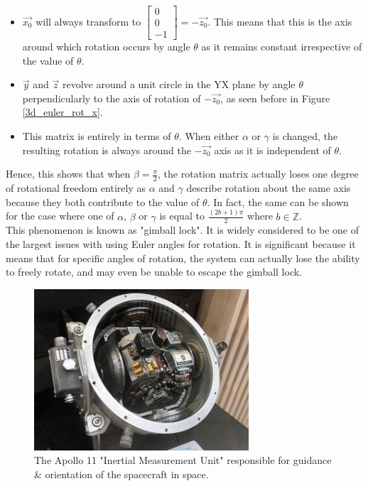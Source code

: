 \documentclass[12pt, a4paper]{article}
\begin{document}
\begin{itemize}[leftmargin=2cm]
    \item $\vec{x_0}$ will always transform to $\begin{bmatrix} 0 \\ 0 \\ -1
    \end{bmatrix} = -\vec{z_0}$. This means that this is the axis around which
    rotation occurs by angle $\theta$ as it remains constant irrespective of the
    value of $\theta$.
    \item $\vec{y}$ and $\vec{z}$ revolve around a unit circle in the YX plane
    by angle $\theta$ perpendicularly to the axis of rotation of $-\vec{z_0}$,
    as seen before in Figure \ref{3d_euler_rot_x}.
    \item This matrix is entirely in terms of $\theta$. When either $\alpha$ or
    $\gamma$ is changed, the resulting rotation is always around the
    $-\vec{z_0}$ axis as it is independent of $\theta$.
\end{itemize}

Hence, this shows that when $\beta = \frac{\pi}{2}$, the rotation matrix
actually loses one degree of rotational freedom entirely as $\alpha$ and
$\gamma$ describe rotation about the same axis because they both contribute to
the value of $\theta$. In fact, the same can be shown for the case where one of
$\alpha$, $\beta$ or $\gamma$ is equal to $\frac{(2b+1)\pi}{2}$ where $b \in
\mathbb{Z}$. \\

This phenomenon is known as "gimball lock". It is widely considered to be one of
the largest issues with using Euler angles for rotation. It is significant
because it means that for specific angles of rotation, the system can actually
lose the ability to freely rotate, and may even be unable to escape the gimball
lock. \\

\pagebreak

\begin{figure}[H]
    \includegraphics[width=8cm]{res/apollo_imu.jpg}
    \centering
    \caption{The Apollo 11 "Inertial Measurement Unit" responsible for guidance \& orientation of the spacecraft in space.}
\end{figure}
\end{document}
